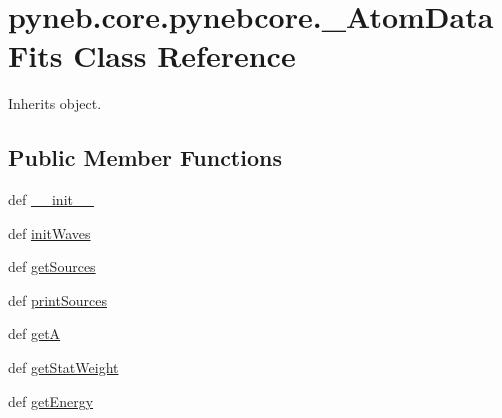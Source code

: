 \hypertarget{classpyneb_1_1core_1_1pynebcore_1_1___atom_data_fits}{\section{pyneb.\-core.\-pynebcore.\-\_\-\-Atom\-Data\-Fits Class Reference}
\label{classpyneb_1_1core_1_1pynebcore_1_1___atom_data_fits}
}


Inherits object.

\subsection*{Public Member Functions}
\begin{DoxyCompactItemize}
\item 
def \hyperlink{classpyneb_1_1core_1_1pynebcore_1_1___atom_data_fits_a626724a08fd24ba2ea2b44307ec6b294}{\-\_\-\-\_\-init\-\_\-\-\_\-}
\item 
def \hyperlink{classpyneb_1_1core_1_1pynebcore_1_1___atom_data_fits_aa30b080423ef6f6e3c342b602a17f8a1}{init\-Waves}
\item 
def \hyperlink{classpyneb_1_1core_1_1pynebcore_1_1___atom_data_fits_a371215f15e583f3d8446744ab5d6c0d8}{get\-Sources}
\item 
def \hyperlink{classpyneb_1_1core_1_1pynebcore_1_1___atom_data_fits_a1915aa59aa8cb2b5a3f9a7b381009f17}{print\-Sources}
\item 
def \hyperlink{classpyneb_1_1core_1_1pynebcore_1_1___atom_data_fits_a4ecca5287d3b6bf0d6e44b9bb184db77}{get\-A}
\item 
def \hyperlink{classpyneb_1_1core_1_1pynebcore_1_1___atom_data_fits_ad0edb5ef48a2f1acdb0d02890aeeb4b6}{get\-Stat\-Weight}
\item 
def \hyperlink{classpyneb_1_1core_1_1pynebcore_1_1___atom_data_fits_ade643ddf8307c8068ad52b9500d894ce}{get\-Energy}
\end{DoxyCompactItemize}
